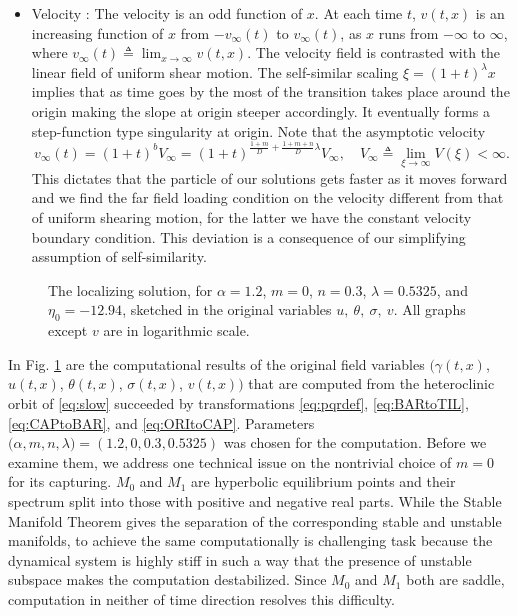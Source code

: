 \documentclass[a4paper,11pt]{article}
\def\red{\color{red}}
\theoremstyle{remark}
\begin{document}
\begin{itemize}
\item Velocity : The velocity is an odd function of $x$. At each time $t$, $v(t,x)$ is an increasing function of $x$ from $-v_\infty(t)$ to $v_\infty(t)$, as $x$ runs from $-\infty$ to $\infty$, where $v_\infty(t)\triangleq \lim_{x \rightarrow \infty} v(t,x)$. The velocity field is contrasted with the linear field of uniform shear motion. The self-similar scaling  $\xi=(1+t)^\lambda x$ implies that as time goes by the most of the transition takes place around the origin making the slope at origin steeper accordingly. It eventually forms a step-function type singularity at origin. Note that the asymptotic velocity $$v_\infty(t)=(1+t)^{b}V_\infty = (1+t)^{\frac{1+m}{D} + \frac{1+m+n}{D}\lambda}V_\infty, \quad V_\infty \triangleq \lim_{\xi \rightarrow \infty} V(\xi) <\infty.$$
This dictates that the particle of our solutions gets faster as it moves forward and we find the far field loading condition on the velocity different from that of uniform shearing motion, for the latter we have the constant velocity boundary condition. This deviation is a consequence of our simplifying assumption of self-similarity.
\end{itemize}

\begin{figure}[ht]
 \centering
\caption{The localizing solution, for $\alpha=1.2$, $m=0$, $n=0.3$, $\lambda =0.5325$, and $\eta_0=-12.94$, sketched in the original variables $u, \ \theta, \ \sigma, \ v$.
All graphs except $v$ are in logarithmic scale.} \label{fig:computation}
\end{figure}

In Fig. \ref{fig:computation} are the computational results of the original field variables $\big(\gamma(t,x)$, $u(t,x)$, $\theta(t,x)$, $\sigma(t,x)$, $v(t,x)\big)$ that are computed from the heteroclinic orbit of \eqref{eq:slow} succeeded by transformations \eqref{eq:pqrdef}, \eqref{eq:BARtoTIL}, \eqref{eq:CAPtoBAR}, and \eqref{eq:ORItoCAP}. Parameters $\big(\alpha,m,n,\lambda)=(1.2,0,0.3,0.5325)$ was chosen for the computation. Before we examine them, we address one technical issue on the nontrivial choice of $m=0$ for its capturing. $M_0$ and $M_1$ are hyperbolic equilibrium points and their spectrum split into those with positive and negative real parts. While the Stable Manifold Theorem gives the separation of the corresponding stable and unstable manifolds, to achieve the same computationally is challenging task because the dynamical system is highly stiff in such a way that the presence of unstable subspace makes the computation destabilized. Since $M_0$ and $M_1$ both are saddle, computation in neither of time direction resolves this difficulty. 
\end{document}
